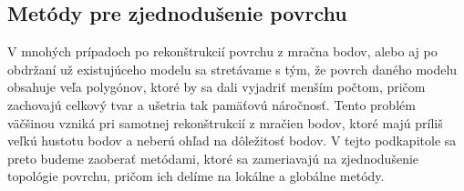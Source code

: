 \subsection{Metódy pre zjednodušenie povrchu}
\noindent V mnohých prípadoch po rekonštrukcií povrchu z mračna bodov, alebo aj po obdržaní už existujúceho modelu sa stretávame s tým, že povrch daného modelu obsahuje veľa polygónov, ktoré by sa dali vyjadriť menším počtom, pričom zachovajú celkový tvar a ušetria tak pamäťovú náročnosť. Tento problém väčšinou vzniká pri samotnej rekonštrukcií z mračien bodov, ktoré majú príliš veľkú hustotu bodov a neberú ohľad na dôležitosť bodov. 
\newline\indent V tejto podkapitole sa preto budeme zaoberať metódami, ktoré sa zameriavajú na zjednodušenie topológie povrchu, pričom ich delíme na lokálne a globálne metódy.  

